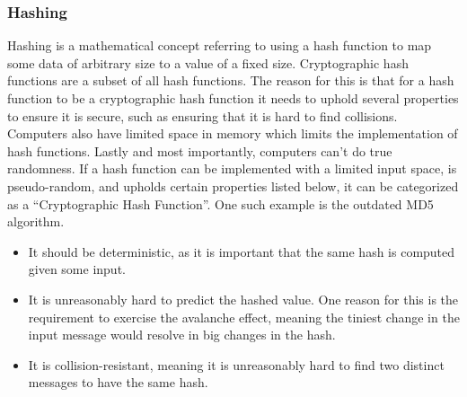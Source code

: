 \documentclass[11pt]{article}
\begin{document}
\subsubsection{Hashing}
\label{sec:org08fd0d1}
Hashing is a mathematical concept referring to using a hash function to map some data of arbitrary size to a value of a fixed size. Cryptographic hash functions are a subset of all hash functions.
The reason for this is that for a hash function to be a cryptographic hash function it needs to uphold several properties to ensure it is secure, such as ensuring that it is hard to find collisions. Computers also have limited space in memory which limits the implementation of hash functions. Lastly and most importantly, computers can't do true randomness.
If a hash function can be implemented with a limited input space, is pseudo-random, and upholds certain properties listed below, it can be categorized as a ``Cryptographic Hash Function''. One such example is the outdated MD5 algorithm.
\begin{itemize}
\item It should be deterministic, as it is important that the same hash is computed given some input.
\item It is unreasonably hard to predict the hashed value. One reason for this is the requirement to exercise the avalanche effect, meaning the tiniest change in the input message would resolve in big changes in the hash.
\item It is collision-resistant, meaning it is unreasonably hard to find two distinct messages to have the same hash.
\end{itemize}
\end{document}
